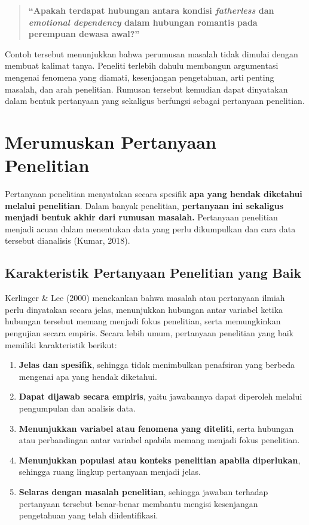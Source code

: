 \documentclass[
  indonesian,
  letterpaper,
  DIV=11,
  numbers=noendperiod]{scrreprt}
\providecommand{\tightlist}{%
  \setlength{\itemsep}{0pt}\setlength{\parskip}{0pt}}
\begin{document}
\begin{quote}
\textbf{``Apakah terdapat hubungan antara kondisi \emph{fatherless} dan
\emph{emotional dependency} dalam hubungan romantis pada perempuan
dewasa awal?''}
\end{quote}

Contoh tersebut menunjukkan bahwa perumusan masalah tidak dimulai dengan
membuat kalimat tanya. Peneliti terlebih dahulu membangun argumentasi
mengenai fenomena yang diamati, kesenjangan pengetahuan, arti penting
masalah, dan arah penelitian. Rumusan tersebut kemudian dapat dinyatakan
dalam bentuk pertanyaan yang sekaligus berfungsi sebagai pertanyaan
penelitian.

\section{Merumuskan Pertanyaan
Penelitian}\label{merumuskan-pertanyaan-penelitian}

Pertanyaan penelitian menyatakan secara spesifik \textbf{apa yang hendak
diketahui melalui penelitian}. Dalam banyak penelitian,
\textbf{pertanyaan ini sekaligus menjadi bentuk akhir dari rumusan
masalah.} Pertanyaan penelitian menjadi acuan dalam menentukan data yang
perlu dikumpulkan dan cara data tersebut dianalisis (Kumar, 2018).

\subsection{Karakteristik Pertanyaan Penelitian yang
Baik}\label{karakteristik-pertanyaan-penelitian-yang-baik}

Kerlinger \& Lee (2000) menekankan bahwa masalah atau pertanyaan ilmiah
perlu dinyatakan secara jelas, menunjukkan hubungan antar variabel
ketika hubungan tersebut memang menjadi fokus penelitian, serta
memungkinkan pengujian secara empiris. Secara lebih umum, pertanyaan
penelitian yang baik memiliki karakteristik berikut:

\begin{enumerate}
\def\labelenumi{\arabic{enumi}.}
\tightlist
\item
  \textbf{Jelas dan spesifik}, sehingga tidak menimbulkan penafsiran
  yang berbeda mengenai apa yang hendak diketahui.
\item
  \textbf{Dapat dijawab secara empiris}, yaitu jawabannya dapat
  diperoleh melalui pengumpulan dan analisis data.
\item
  \textbf{Menunjukkan variabel atau fenomena yang diteliti}, serta
  hubungan atau perbandingan antar variabel apabila memang menjadi fokus
  penelitian.
\item
  \textbf{Menunjukkan populasi atau konteks penelitian apabila
  diperlukan}, sehingga ruang lingkup pertanyaan menjadi jelas.
\item
  \textbf{Selaras dengan masalah penelitian}, sehingga jawaban terhadap
  pertanyaan tersebut benar-benar membantu mengisi kesenjangan
  pengetahuan yang telah diidentifikasi.
\end{enumerate}
\end{document}
